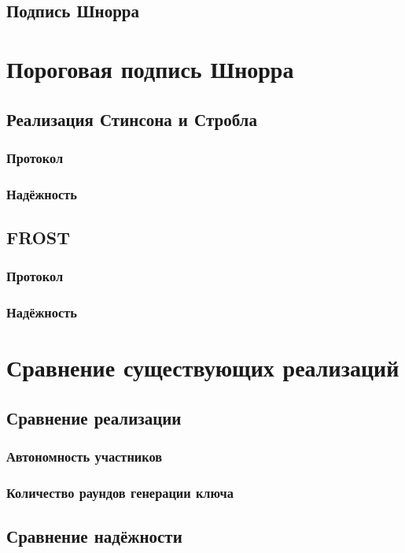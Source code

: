 \begin{enumerate}
\end{enumerate}


\section{Подпись Шнорра}

\chapter{Пороговая подпись Шнорра}
\section{Реализация Стинсона и Стробла}
\subsection{Протокол}
\subsection{Надёжность}
\section{FROST}
\subsection{Протокол}
\subsection{Надёжность}
\chapter{Сравнение существующих реализаций}
\section{Сравнение реализации}
\subsection{Автономность участников}
\subsection{Количество раундов генерации ключа}
\section{Сравнение надёжности}